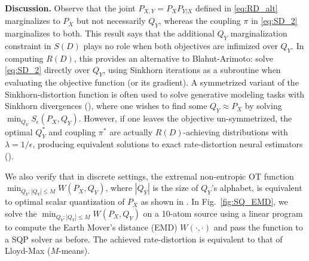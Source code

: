 \documentclass{article} %
\begin{document}

\textbf{Discussion.}
Observe that the joint $P_{X,Y}=P_X P_{Y|X}$ defined in \eqref{eq:RD_alt} marginalizes to $P_X$ but not necessarily $Q_Y$, whereas the coupling $\pi$ in \eqref{eq:SD_2} marginalizes to both. This result says that the additional $Q_Y$ marginalization constraint in $S(D)$ plays no role when both objectives are infimized over $Q_Y$. In computing $R(D)$, this provides an alternative to Blahut-Arimoto: solve \eqref{eq:SD_2} directly over $Q_Y$, using Sinkhorn iterations as a subroutine when evaluating the objective function (or its gradient).  
A symmetrized variant of the Sinkhorn-distortion function is often used to solve generative modeling tasks with Sinkhorn divergences (\cite{sinkhornGAN, salimans2018improving, shen2020sinkhorn}), where one wishes to find some $Q_Y \approx P_X$ by solving $\min_{Q_Y} S_\epsilon (P_X, Q_Y)$. However, if one leaves the objective un-symmetrized, the optimal $Q_Y^*$ and coupling $\pi^*$ are actually $R(D)$-achieving distributions with $\lambda=1/\epsilon$, producing equivalent solutions to exact rate-distortion neural estimators (\cite{NERD}).

We also verify that in discrete settings, the extremal non-entropic OT function $\min_{Q_Y: |Q_Y| \leq M} W(P_X, Q_Y)$, where $|Q_Y|$ is the size of $Q_Y$'s alphabet, is equivalent to optimal scalar quantization of $P_X$ as shown in \cite{GrayOT}. In Fig.~\ref{fig:SQ_EMD}, we solve the $\min_{Q_Y: |Q_Y| \leq M} W(P_X, Q_Y)$ on a 10-atom source using a linear program to compute the Earth Mover's distance (EMD) $W(\cdot, \cdot)$ and pass the function to a SQP solver as before. The achieved rate-distortion is equivalent to that of Lloyd-Max ($M$-means). 



\end{document}
